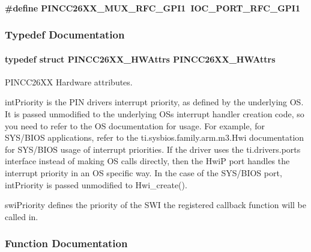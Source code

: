 \paragraph[{P\+I\+N\+C\+C26\+X\+X\+\_\+\+M\+U\+X\+\_\+\+R\+F\+C\+\_\+\+G\+P\+I1}]{\setlength{\rightskip}{0pt plus 5cm}\#define P\+I\+N\+C\+C26\+X\+X\+\_\+\+M\+U\+X\+\_\+\+R\+F\+C\+\_\+\+G\+P\+I1~I\+O\+C\+\_\+\+P\+O\+R\+T\+\_\+\+R\+F\+C\+\_\+\+G\+P\+I1}\label{_p_i_n_c_c26_x_x_8h_a71f92d2ec8410256434ce0968476a749}


\subsubsection{Typedef Documentation}
\paragraph[{P\+I\+N\+C\+C26\+X\+X\+\_\+\+H\+W\+Attrs}]{\setlength{\rightskip}{0pt plus 5cm}typedef struct {\bf P\+I\+N\+C\+C26\+X\+X\+\_\+\+H\+W\+Attrs}  {\bf P\+I\+N\+C\+C26\+X\+X\+\_\+\+H\+W\+Attrs}}\label{_p_i_n_c_c26_x_x_8h_ab5e14c623ee19df328043d474fa8e0d9}


P\+I\+N\+C\+C26\+X\+X Hardware attributes. 

int\+Priority is the P\+I\+N driver\textquotesingle{}s interrupt priority, as defined by the underlying O\+S. It is passed unmodified to the underlying O\+S\textquotesingle{}s interrupt handler creation code, so you need to refer to the O\+S documentation for usage. For example, for S\+Y\+S/\+B\+I\+O\+S applications, refer to the ti.\+sysbios.\+family.\+arm.\+m3.\+Hwi documentation for S\+Y\+S/\+B\+I\+O\+S usage of interrupt priorities. If the driver uses the ti.\+drivers.\+ports interface instead of making O\+S calls directly, then the Hwi\+P port handles the interrupt priority in an O\+S specific way. In the case of the S\+Y\+S/\+B\+I\+O\+S port, int\+Priority is passed unmodified to Hwi\+\_\+create().

swi\+Priority defines the priority of the S\+W\+I the registered callback function will be called in. 

\subsubsection{Function Documentation}
